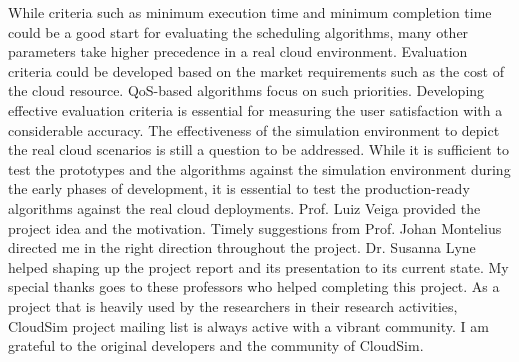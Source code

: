 \documentclass[times, 10pt,twocolumn]{article}
\begin{document}
While criteria such as minimum execution time and minimum completion time could be a good start for evaluating the scheduling algorithms, many other parameters take higher precedence in a real cloud environment. Evaluation criteria could be developed based on the market requirements such as the cost of the cloud resource. QoS-based algorithms focus on such priorities. Developing effective evaluation criteria is essential for measuring the user satisfaction with a considerable accuracy. The effectiveness of the simulation environment to depict the real cloud scenarios is still a question to be addressed. While it is sufficient to test the prototypes and the algorithms against the simulation environment during the early phases of development, it is essential to test the production-ready algorithms against the real cloud deployments.
Prof. Luiz Veiga provided the project idea and the motivation. Timely suggestions from Prof. Johan Montelius directed me in the right direction throughout the project. Dr. Susanna Lyne helped shaping up the project report and its presentation to its current state. My special thanks goes to these professors who helped completing this project. As a project that is heavily used by the researchers in their research activities, CloudSim project mailing list is always active with a vibrant community. I am grateful to the original developers and the community of CloudSim.



\nocite{ex1,ex2}


\end{document}
